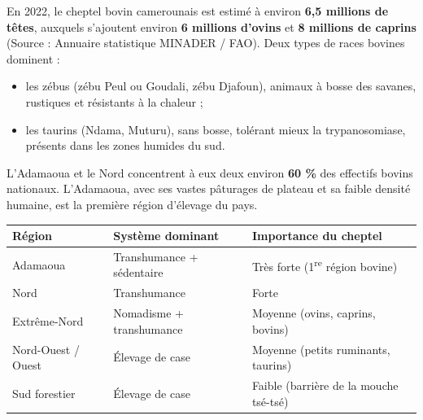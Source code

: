 \documentclass[11pt]{article}
\newcommand{\cle}[1]{{\popxbold\color{popdark}#1}}
\begin{document}
\begin{exemplebox}
En 2022, le cheptel bovin camerounais est estimé à environ \textbf{6,5 millions de têtes}, auxquels s'ajoutent environ \textbf{6 millions d'ovins} et \textbf{8 millions de caprins} (Source : Annuaire statistique MINADER / FAO). Deux types de races bovines dominent :
\begin{itemize}
\item les \cle{zébus} (zébu Peul ou Goudali, zébu Djafoun), animaux à bosse des savanes, rustiques et résistants à la chaleur ;
\item les \cle{taurins} (Ndama, Muturu), sans bosse, tolérant mieux la trypanosomiase, présents dans les zones humides du sud.
\end{itemize}
L'Adamaoua et le Nord concentrent à eux deux environ \textbf{60 \%} des effectifs bovins nationaux. L'Adamaoua, avec ses vastes pâturages de plateau et sa faible densité humaine, est la première région d'élevage du pays.
\end{exemplebox}

\begin{center}
\begin{tabularx}{\linewidth}{|l|X|X|}
\hline
\rowcolor{popblueL} \textbf{Région} & \textbf{Système dominant} & \textbf{Importance du cheptel} \\
\hline
Adamaoua & Transhumance + sédentaire & Très forte (1\textsuperscript{re} région bovine) \\
\hline
Nord & Transhumance & Forte \\
\hline
Extrême-Nord & Nomadisme + transhumance & Moyenne (ovins, caprins, bovins) \\
\hline
Nord-Ouest / Ouest & Élevage de case & Moyenne (petits ruminants, taurins) \\
\hline
Sud forestier & Élevage de case & Faible (barrière de la mouche tsé-tsé) \\
\hline
\end{tabularx}
\end{center}
\end{document}

